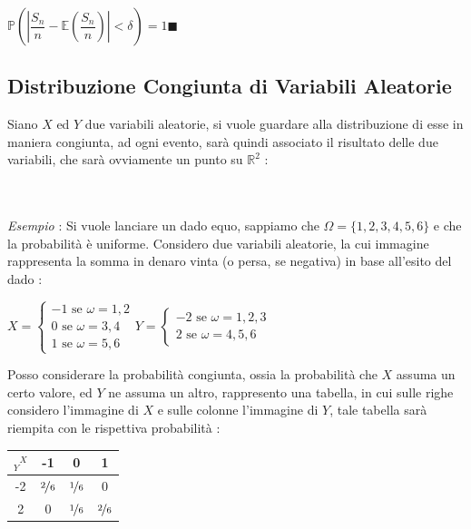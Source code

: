 \documentclass[12pt, letterpaper]{article}
\newcommand{\R}{{\mathbb R}}
\newcommand{\E}{{\mathbb E}}
\newcommand{\acc}{\\\hphantom{}\\}
\newcommand{\Prob}{{\mathbb P}}
\begin{document}
\begin{center}
    \(\Prob(|\dfrac{S_n}{n}-\E(\dfrac{S_n}{n})|<\delta)=1\)\hphantom{aaaa}\(\blacksquare\)
\end{center}
\newpage\subsection{Distribuzione Congiunta di Variabili Aleatorie}
Siano \(X\) ed \(Y\) due variabili aleatorie, si vuole guardare alla distribuzione di esse in maniera 
congiunta, ad ogni evento, sarà quindi associato il risultato delle due variabili, che sarà ovviamente 
un punto su \(\R^2\) :
\begin{figure}[h]
\end{figure}\acc
\textit{Esempio }: Si vuole lanciare un dado equo, sappiamo che \(\Omega=\{1,2,3,4,5,6\}\) e che la 
probabilità è uniforme. Considero due variabili aleatorie, la cui immagine rappresenta la somma in 
denaro vinta (o persa, se negativa) in base all'esito del dado : \begin{center}
    \(
    X=\begin{cases}
        -1\text{ se }\omega =1,2\\ 
        0\text{ se }\omega =3,4\\ 
        1\text{ se }\omega =5,6
    \end{cases}    
    \)\hphantom{text}\( Y=\begin{cases}
        -2\text{ se }\omega =1,2,3\\ 
        2\text{ se }\omega =4,5,6
    \end{cases}    
    \)
\end{center}
Posso considerare la probabilità congiunta, ossia la probabilità che \(X\) assuma un certo valore, 
ed \(Y\) ne assuma un altro, rappresento una tabella, in cui sulle righe considero l'immagine di \(X\) 
e sulle colonne l'immagine di \(Y\), tale tabella sarà riempita con le rispettiva probabilità : \begin{center}
    \begin{tabular}{|c|c|c|c|}
        \hline
        \rowcolor[HTML]{FD6864} 
        \cellcolor[HTML]{C0C0C0}\(\text{}^{\text{ }X}_Y\) & -1  & 0   & 1   \\ \hline
        \cellcolor[HTML]{9698ED}-2 & \(\nicefrac{2}{6}\) & \(\nicefrac{1}{6}\) & 0   \\ \hline
        \cellcolor[HTML]{9698ED}2  & 0   & \(\nicefrac{1}{6}\) & \(\nicefrac{2}{6}\) \\ \hline
        \end{tabular}
\end{center}
\end{document}
